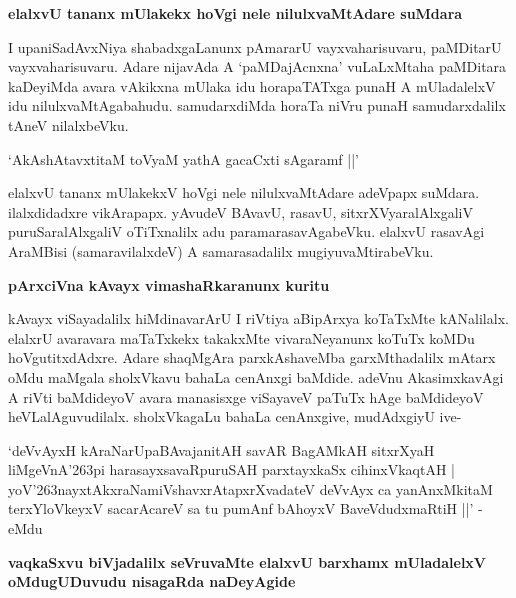\noindent
{\bf\large{elalxvU tananx mUlakekx hoVgi nele nilulxvaMtAdare suMdara}}\label{page246}

I upaniSadAvxNiya shabadxgaLanunx pAmararU vayxvaharisuvaru, paMDitarU vayxvaharisuvaru. Adare nijavAda A `paMDajAcnxna' vuLaLxMtaha paMDitara kaDeyiMda avara vAkikxna mUlaka idu horapaTATxga punaH A mUladalelxV idu nilulxvaMtAgabahudu. samudarxdiMda horaTa niVru punaH samudarxdalilx tAneV nilalxbeVku.

\begin{shloka}
`AkAshAtavxtitaM toVyaM yathA gacaCxti sAgaramf ||'\label{247}
\end{shloka}

elalxvU tananx mUlakekxV hoVgi nele nilulxvaMtAdare adeVpapx suMdara. ilalxdidadxre vikArapapx. yAvudeV BAvavU, rasavU, sitxrXVyaralAlxgaliV puruSaralAlxgaliV oTiTxnalilx adu paramarasavAgabeVku. elalxvU rasavAgi AraMBisi (samaravilalxdeV) A samarasadalilx mugiyuvaMtirabeVku.

\noindent
{\bf\large{pArxciVna kAvayx vimashaRkaranunx kuritu}}

kAvayx viSayadalilx hiMdinavarArU I riVtiya aBipArxya koTaTxMte kANalilalx. elalxrU avaravara maTaTxkekx takakxMte vivaraNeyanunx koTuTx koMDu hoVgutitxdAdxre. Adare shaqMgAra parxkAshaveMba garxMthadalilx mAtarx oMdu maMgala sholxVkavu bahaLa cenAnxgi baMdide. adeVnu AkasimxkavAgi A riVti baMdideyoV avara manasisxge viSayaveV paTuTx hAge baMdideyoV heVLalAguvudilalx. sholxVkagaLu bahaLa cenAnxgive, mudAdxgiyU ive-

\begin{shloka}
`deVvAyxH kAraNarUpaBAvajanitAH savAR BagAMkAH sitxrXyaH\\\label{247}
liMgeVnA\char'263pi harasayxsavaRpuruSAH parxtayxkaSx cihinxVkaqtAH |\\
yoV\char'263nayxtAkxraNamiVshavxrAtapxrXvadateV deVvAyx ca yanAnxMkitaM \\
terxYloVkeyxV sacarAcareV sa tu pumAnf bAhoyxV BaveVdudxmaRtiH ||' - eMdu
\end{shloka}

\noindent
{\bf\large{vaqkaSxvu biVjadalilx seVruvaMte elalxvU barxhamx mUladalelxV oMdugUDuvudu nisagaRda naDeyAgide}}\label{page247}

